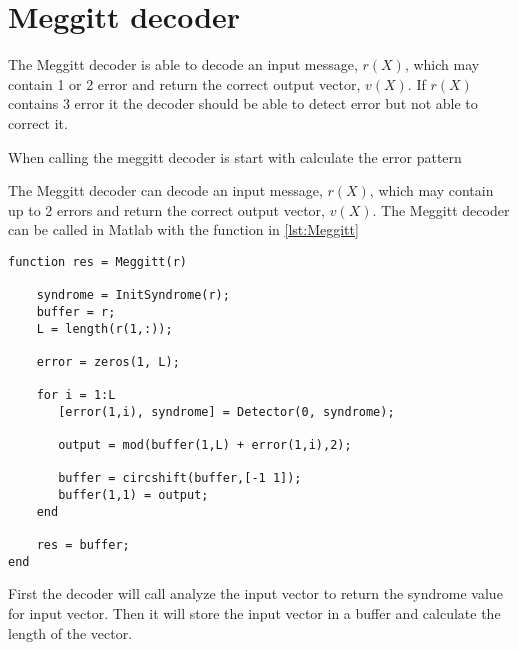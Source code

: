 \documentclass[Main]{subfiles}
\begin{document}
\section{Meggitt decoder}
The Meggitt decoder is able to decode an input message, $r(X)$, which may contain 1 or 2 error and return the correct output vector, $v(X)$.
If $r(X)$ contains 3 error it the decoder should be able to detect error but not able to correct it.

When calling the meggitt decoder is start with calculate the error pattern










The Meggitt decoder can decode an input message, $r(X)$, which may contain up to 2 errors and return the correct output vector, $v(X)$.
The Meggitt decoder can be called in Matlab with the function in \codeTitle \ref{lst:Meggitt}

\begin{lstlisting}[caption=Meggit decoder function, style=Code-Matlab, label=lst:Meggitt]
function res = Meggitt(r)

	syndrome = InitSyndrome(r);
	buffer = r;
	L = length(r(1,:));
	
	error = zeros(1, L);
	
	for i = 1:L
	   [error(1,i), syndrome] = Detector(0, syndrome); 
	
	   output = mod(buffer(1,L) + error(1,i),2);
	
	   buffer = circshift(buffer,[-1 1]);
	   buffer(1,1) = output;   
	end
	
	res = buffer;
end
\end{lstlisting}
First the decoder will call analyze the input vector to return the syndrome value for input vector.
Then it will store the input vector in a buffer and calculate the length of the vector.
\end{document}
